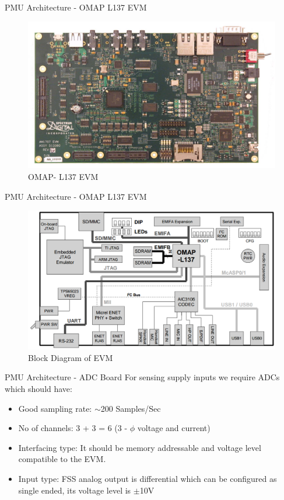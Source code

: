 \documentclass{beamer}
\begin{document}

\begin{frame}{PMU Architecture - OMAP L137 EVM}
\begin{figure}
\includegraphics[width=\textwidth]{fig/omapl137-evm-board.jpg}
\caption{ OMAP- L137 EVM }
\end{figure}
\end{frame}

\begin{frame}{PMU Architecture - OMAP L137 EVM}
\begin{figure}
\includegraphics[width=\textwidth]{fig/OMAP_L137EVM.png}
\caption{Block Diagram of EVM \cite{site:evm}}
\end{figure}
\end{frame}

\begin{frame}{PMU Architecture - ADC Board}
For sensing supply inputs we require ADCs which should have:
\begin{itemize}
\item Good sampling rate: $\sim$200 Samples/Sec
\item No of channels: 3 + 3 = 6 (3 - $\phi$ voltage and current) 
\item Interfacing type: It should be memory addressable and voltage level compatible  to the EVM.
\item Input type: FSS analog output is differential which can be configured as single ended, its voltage level is $\pm$10V
\end{itemize}
\end{frame}
\end{document}
